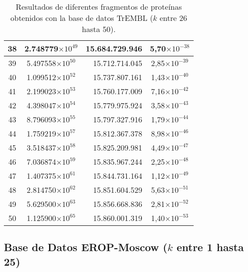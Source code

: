 \begin{table}[!hbt]
\begin{tabular}{| c  r  r  c |}
   38 & \multicolumn{1}{c}{2.748779$\times 10^{49}$} & 15.684.729.946 & 5,70$\times 10^{-38}$\\ \hline
   39 & \multicolumn{1}{c}{5.497558$\times 10^{50}$} & 15.712.714.045 & 2,85$\times 10^{-39}$\\ \hline
   40 & \multicolumn{1}{c}{1.099512$\times 10^{52}$} & 15.737.807.161 & 1,43$\times 10^{-40}$\\ \hline
   41 & \multicolumn{1}{c}{2.199023$\times 10^{53}$} & 15.760.177.009 & 7,16$\times 10^{-42}$\\ \hline
   42 & \multicolumn{1}{c}{4.398047$\times 10^{54}$} & 15.779.975.924 & 3,58$\times 10^{-43}$\\ \hline
   43 & \multicolumn{1}{c}{8.796093$\times 10^{55}$} & 15.797.327.916 & 1,79$\times 10^{-44}$\\ \hline
   44 & \multicolumn{1}{c}{1.759219$\times 10^{57}$} & 15.812.367.378 & 8,98$\times 10^{-46}$\\ \hline
   45 & \multicolumn{1}{c}{3.518437$\times 10^{58}$} & 15.825.209.981 & 4,49$\times 10^{-47}$\\ \hline
   46 & \multicolumn{1}{c}{7.036874$\times 10^{59}$} & 15.835.967.244 & 2,25$\times 10^{-48}$\\ \hline
   47 & \multicolumn{1}{c}{1.407375$\times 10^{61}$} & 15.844.731.164 & 1,12$\times 10^{-49}$\\ \hline
   48 & \multicolumn{1}{c}{2.814750$\times 10^{62}$} & 15.851.604.529 & 5,63$\times 10^{-51}$\\ \hline
   49 & \multicolumn{1}{c}{5.629500$\times 10^{63}$} & 15.856.668.836 & 2,81$\times 10^{-52}$\\ \hline
   50 & \multicolumn{1}{c}{1.125900$\times 10^{65}$} & 15.860.001.319 & 1,40$\times 10^{-53}$\\ \hline
   \end{tabular}
   \caption{Resultados de diferentes fragmentos de proteínas obtenidos con la base de datos TrEMBL ($k$ entre 26 hasta 50).}
   \label{tb:labela22}
\end{table}

\newpage

\subsection*{Base de Datos EROP-Moscow ($k$ entre 1 hasta 25)}

